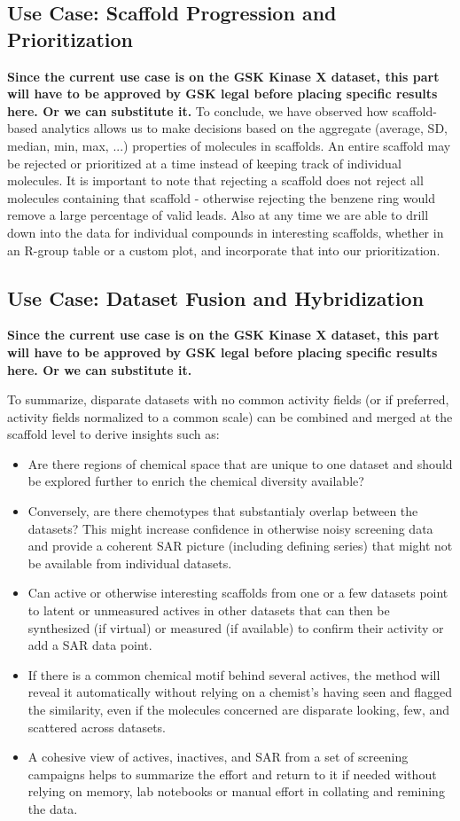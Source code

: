\documentclass[journal=jacsat,manuscript=article]{achemso}
\begin{document}
\subsection{Use Case: Scaffold Progression and Prioritization}
\textbf{Since the current use case is on the GSK Kinase X dataset, this part will have to be approved by GSK legal before placing specific results here. Or we can substitute it.}
To conclude, we have observed how scaffold-based analytics allows us to make decisions based on the aggregate (average, SD, median, min, max, ...) properties of molecules in scaffolds. An entire scaffold may be rejected or prioritized at a time instead of keeping track of individual molecules. It is important to note that rejecting a scaffold does not reject all molecules containing that scaffold - otherwise rejecting the benzene ring would remove a large percentage of valid leads. Also at any time we are able to drill down into the data for individual compounds in interesting scaffolds, whether in an R-group table or a custom plot, and incorporate that into our prioritization.   

\subsection{Use Case: Dataset Fusion and Hybridization}
\textbf{Since the current use case is on the GSK Kinase X dataset, this part will have to be approved by GSK legal before placing specific results here. Or we can substitute it.}
  
To summarize, disparate datasets with no common activity fields (or if preferred, activity fields normalized to a common scale) can be combined and merged at the scaffold level to derive insights such as:
\begin{itemize}
\item Are there regions of chemical space that are unique to one dataset and should be explored further to enrich the chemical diversity available?
\item Conversely, are there chemotypes that substantialy overlap between the datasets?  This might increase confidence in otherwise noisy screening data and provide a coherent SAR picture (including defining series) that might not be available from individual datasets.
\item Can active or otherwise interesting scaffolds from one or a few datasets point to latent or unmeasured actives in other datasets that can then be synthesized (if virtual) or measured (if available) to confirm their activity or add a SAR data point. 
\item If there is a common chemical motif behind several actives, the method will reveal it automatically without relying on a chemist's having seen and flagged the similarity, even if the molecules concerned are disparate looking, few, and scattered across datasets.
\item A cohesive view of actives, inactives, and SAR from a set of screening campaigns helps to summarize the effort and return to it if needed without relying on memory, lab notebooks or manual effort in collating and remining the data.   
\end{itemize} 
\end{document}

